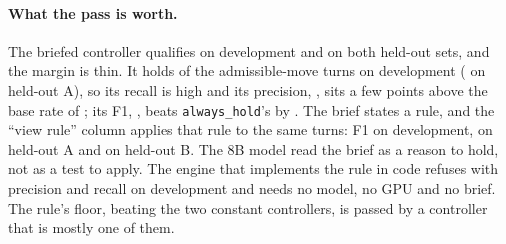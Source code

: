 \documentclass[11pt]{article}
\begin{document}
\begin{table}[t]
\centering
\small
\resizebox{\linewidth}{!}{}
\caption{The pinned Bonsai-8B base controller, no brief, live, qualification v2 (admissible-move turns). Completions: runs reaching their expected end, without $\to$ with the controller.}
\label{tab:base}
\end{table}

\begin{table}[t]
\centering
\small
\resizebox{\linewidth}{!}{}
\caption{The same controller with the brief, live, qualification v2. Held-out A: unused seeds; held-out B: the open-gate scenarios.}
\label{tab:brief}
\end{table}

\begin{table}[t]
\centering
\small
\resizebox{\linewidth}{!}{}
\caption{The state engine \texttt{bitagent-state-v1} alone (no controller), live, scored by the v2 conditions on its refusals.}
\label{tab:engine}
\end{table}

\paragraph{What the pass is worth.} The briefed controller qualifies on development and on both held-out sets, and the margin is thin. It holds \briefDevelopmentHoldShare{} of the admissible-move turns on development (\briefHeldoutAHoldShare{} on held-out A), so its recall is high and its precision, \briefDevelopmentPrecision{}, sits a few points above the base rate of \briefDevelopmentBase; its F1, \briefDevelopmentFOne, beats \texttt{always\_hold}'s by \briefDevelopmentFOneMargin. The brief states a rule, and the ``view rule'' column applies that rule to the same turns: F1 \briefDevelopmentStateFOne{} on development, \briefHeldoutAStateFOne{} on held-out A and \briefHeldoutBStateFOne{} on held-out B. The 8B model read the brief as a reason to hold, not as a test to apply. The engine that implements the rule in code refuses with precision \engineDevelopmentPrecision{} and recall \engineDevelopmentRecall{} on development and needs no model, no GPU and no brief. The rule's floor, beating the two constant controllers, is passed by a controller that is mostly one of them.
\end{document}
